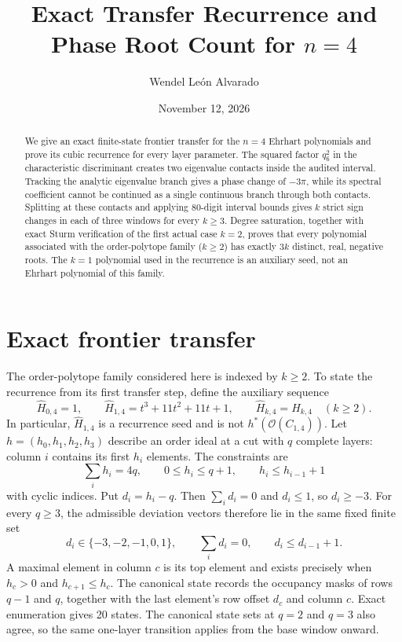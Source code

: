 \documentclass[11pt]{article}
\title{Exact Transfer Recurrence and Phase Root Count for $n=4$}
\author{Wendel Le\'on Alvarado}
\date{November 12, 2026}
\begin{document}
\maketitle

\begin{abstract}
We give an exact finite-state frontier transfer for the $n=4$ Ehrhart
polynomials and prove its cubic recurrence for every layer parameter.
The squared factor $q_6^2$ in the characteristic discriminant creates
two eigenvalue contacts inside the audited interval. Tracking the
analytic eigenvalue branch gives a phase change of $-3\pi$, while its
spectral coefficient cannot be continued as a single continuous branch
through both contacts. Splitting at these contacts and applying
80-digit interval bounds gives $k$ strict sign changes in each of three
windows for every $k\geq3$. Degree saturation, together with exact
Sturm verification of the first actual case $k=2$, proves that every
polynomial associated with the order-polytope family ($k\geq2$) has
exactly $3k$ distinct, real, negative roots. The $k=1$ polynomial used
in the recurrence is an auxiliary seed, not an Ehrhart polynomial of
this family.
\end{abstract}

\section{Exact frontier transfer}
The order-polytope family considered here is indexed by $k\geq2$.
To state the recurrence from its first transfer step, define the
auxiliary sequence
\[
 \widehat H_{0,4}=1,\qquad
 \widehat H_{1,4}=t^3+11t^2+11t+1,\qquad
 \widehat H_{k,4}=H_{k,4}\quad(k\geq2).
\]
In particular, $\widehat H_{1,4}$ is a recurrence seed and is not
$h^*(\mathcal O(C_{1,4}))$.
Let $h=(h_0,h_1,h_2,h_3)$ describe an order ideal at a cut with $q$
complete layers: column $i$ contains its first $h_i$ elements. The
constraints are
\[
  \sum_i h_i=4q,\qquad 0\leq h_i\leq q+1,\qquad
  h_i\leq h_{i-1}+1
\]
with cyclic indices. Put $d_i=h_i-q$. Then $\sum_i d_i=0$ and $d_i\leq
1$, so $d_i\geq-3$. For every $q\geq3$, the admissible deviation vectors
therefore lie in the same fixed finite set
\[
  d_i\in\{-3,-2,-1,0,1\},\qquad
  \sum_i d_i=0,\qquad d_i\leq d_{i-1}+1.
\]
A maximal element in column $c$ is its top element and exists precisely
when $h_c>0$ and $h_{c+1}\leq h_c$. The canonical state records the
occupancy masks of rows $q-1$ and $q$, together with the last element's
row offset $d_c$ and column $c$. Exact enumeration gives 20 states.
The canonical state sets at $q=2$ and $q=3$ also agree, so the same
one-layer transition applies from the base window onward.
\end{document}
